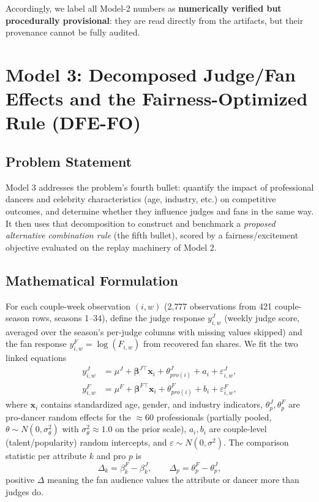 \documentclass[11pt]{article}
\begin{document}
Accordingly, we label all Model-2 numbers as \textbf{numerically verified but
procedurally provisional}: they are read directly from the artifacts, but their
provenance cannot be fully audited.

\section{Model 3: Decomposed Judge/Fan Effects and the Fairness-Optimized Rule (DFE-FO)}
\label{sec:m3}

\subsection{Problem Statement}

Model 3 addresses the problem's fourth bullet: quantify the impact of professional
dancers and celebrity characteristics (age, industry, etc.) on competitive outcomes, and
determine whether they influence judges and fans in the same way. It then uses that
decomposition to construct and benchmark a \emph{proposed alternative combination rule}
(the fifth bullet), scored by a fairness/excitement objective evaluated on the replay
machinery of Model 2.

\subsection{Mathematical Formulation}

For each couple-week observation $(i,w)$ (2{,}777 observations from 421 couple-season
rows, seasons 1--34), define the judge response $y^{J}_{i,w}$ (weekly judge score,
averaged over the season's per-judge columns with missing values skipped) and the fan
response $y^{F}_{i,w} = \log(F_{i,w})$ from recovered fan shares. We fit the two linked
equations
\begin{align}
  y^{J}_{i,w} &= \mu^{J} + \boldsymbol{\beta}^{J\top} \mathbf{x}_i
  + \theta^{J}_{pro(i)} + a_i + \varepsilon^{J}_{i,w}, \label{eq:judge_eq}\\
  y^{F}_{i,w} &= \mu^{F} + \boldsymbol{\beta}^{F\top} \mathbf{x}_i
  + \theta^{F}_{pro(i)} + b_i + \varepsilon^{F}_{i,w}, \label{eq:fan_eq}
\end{align}
where $\mathbf{x}_i$ contains standardized age, gender, and industry indicators,
$\theta^{J}_{p}, \theta^{F}_{p}$ are pro-dancer random effects for the $\approx 60$
professionals (partially pooled, $\theta \sim N(0, \sigma^2_\theta)$ with
$\sigma^2_\theta \approx 1.0$ on the prior scale), $a_i, b_i$ are couple-level
(talent/popularity) random intercepts, and $\varepsilon \sim N(0,\sigma^2)$. The
comparison statistic per attribute $k$ and pro $p$ is
\begin{equation}
  \Delta_k = \beta^{F}_{k} - \beta^{J}_{k}, \qquad
  \Delta_p = \theta^{F}_{p} - \theta^{J}_{p},
  \label{eq:delta}
\end{equation}
positive $\Delta$ meaning the fan audience values the attribute or dancer more than
judges do.
\end{document}

